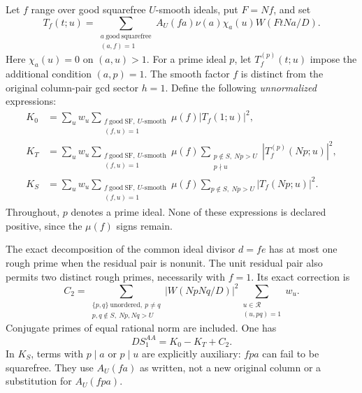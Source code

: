 Let $f$ range over good squarefree $U$-smooth ideals, put $F=Nf$, and set
\begin{equation}\label{rma:T}
 T_f(t;u)=\sum_{\substack{a\ \mathrm{good\ squarefree}\\(a,f)=1}}
 A_U(fa)\nu(a)\chi_a(u)W(FtNa/D).
\end{equation}
Here $\chi_a(u)=0$ on $(a,u)>1$. For a prime ideal $p$, let
$T_f^{(p)}(t;u)$ impose the additional condition $(a,p)=1$.
The smooth factor $f$ is distinct from the original column-pair gcd
sector $h=1$. Define the following \emph{unnormalized} expressions:
\begin{align}
 K_0&=\sum_u w_u\sum_{\substack{f\ \mathrm{good\ SF},\ U\text{-smooth}\\
                              (f,u)=1}}
                       \mu(f)|T_f(1;u)|^2,\label{rma:Kzero}\\
 K_T&=\sum_u w_u\sum_{\substack{f\ \mathrm{good\ SF},\ U\text{-smooth}\\
                              (f,u)=1}}\mu(f)
       \sum_{\substack{p\notin S,\ Np>U\\p\nmid u}}
                       |T_f^{(p)}(Np;u)|^2,\label{rma:KT}\\
 K_S&=\sum_u w_u\sum_{\substack{f\ \mathrm{good\ SF},\ U\text{-smooth}\\
                              (f,u)=1}}\mu(f)
       \sum_{p\notin S,\ Np>U}|T_f(Np;u)|^2.\label{rma:KS}
\end{align}
Throughout, $p$ denotes a prime ideal. None of these expressions is
declared positive, since the $\mu(f)$ signs remain.

The exact decomposition of the common ideal divisor $d=fe$ has at most
one rough prime when the residual pair is nonunit. The unit residual
pair also permits two distinct rough primes, necessarily with $f=1$.
Its exact correction is
\begin{equation}\label{rma:Ctwo}
 C_2=\sum_{\substack{\{p,q\}\ \mathrm{unordered},\ p\ne q\\
                     p,q\notin S,\ Np,Nq>U}}
 |W(NpNq/D)|^2\sum_{\substack{u\in\mathcal R\\(u,pq)=1}}w_u.
\end{equation}
Conjugate primes of equal rational norm are included. One has
\begin{equation}\label{rma:exact}
 DS_1^{AA}=K_0-K_T+C_2.
\end{equation}
In $K_S$, terms with $p\mid a$ or $p\mid u$ are explicitly auxiliary:
$ fpa$ can fail to be squarefree. They use $A_U(fa)$ as written, not a
new original column or a substitution for $A_U(fpa)$.

